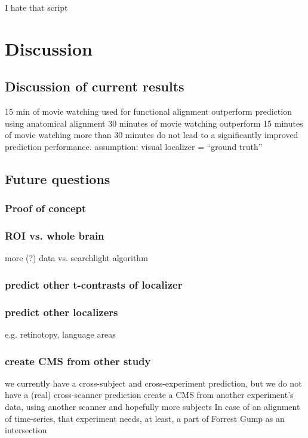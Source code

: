 I hate that script







\section{Discussion}


\subsection{Discussion of current results}
%
15 min of movie watching used for functional alignment outperform prediction
using anatomical alignment
%
30 minutes of movie watching outperform 15 minutes of movie watching
%
more than 30 minutes do not lead to a significantly improved prediction
performance.
%
assumption: visual localizer = ``ground truth''


\subsection{Future questions}
%

\subsubsection{Proof of concept}
%

\subsubsection{ROI vs. whole brain}
%
more (?) data vs. searchlight algorithm


\subsubsection{predict other t-contrasts of localizer}


\subsubsection{predict other localizers}
%
e.g. retinotopy, language areas


\subsubsection{create CMS from other study}
%
we currently have a cross-subject and cross-experiment prediction,
but we do not have a (real) cross-scanner prediction
%
create a CMS from another experiment’s data,
using another scanner and hopefully more subjects
%
In case of an alignment of time-series,
that experiment needs, at least, a part of Forrest Gump as an intersection


